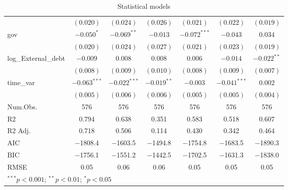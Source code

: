\begin{table}
\begin{center}
\begin{tabular}{l c c c c c c}
                    & $(0.020)$      & $(0.024)$      & $(0.026)$     & $(0.021)$      & $(0.022)$      & $(0.019)$     \\
gov                 & $-0.050^{*}$   & $-0.069^{**}$  & $-0.013$      & $-0.072^{***}$ & $-0.043$       & $0.034$       \\
                    & $(0.020)$      & $(0.024)$      & $(0.027)$     & $(0.021)$      & $(0.023)$      & $(0.019)$     \\
log\_External\_debt & $-0.009$       & $0.008$        & $0.008$       & $0.006$        & $-0.014$       & $-0.022^{**}$ \\
                    & $(0.008)$      & $(0.009)$      & $(0.010)$     & $(0.008)$      & $(0.009)$      & $(0.007)$     \\
time\_var           & $-0.063^{***}$ & $-0.022^{***}$ & $-0.019^{**}$ & $-0.003$       & $-0.041^{***}$ & $0.002$       \\
                    & $(0.005)$      & $(0.006)$      & $(0.006)$     & $(0.005)$      & $(0.005)$      & $(0.004)$     \\
\hline
\hline
Num.Obs. & \num{576} & \num{576} & \num{576} & \num{576} & \num{576} & \num{576}\\
R2 & \num{0.794} & \num{0.638} & \num{0.351} & \num{0.583} & \num{0.518} & \num{0.607}\\
R2 Adj. & \num{0.718} & \num{0.506} & \num{0.114} & \num{0.430} & \num{0.342} & \num{0.464}\\
AIC & \num{-1808.4} & \num{-1603.5} & \num{-1494.8} & \num{-1754.8} & \num{-1683.5} & \num{-1890.3}\\
BIC & \num{-1756.1} & \num{-1551.2} & \num{-1442.5} & \num{-1702.5} & \num{-1631.3} & \num{-1838.0}\\
RMSE & \num{0.05} & \num{0.06} & \num{0.06} & \num{0.05} & \num{0.05} & \num{0.05}\\
\hline
\multicolumn{7}{l}{\scriptsize{$^{***}p<0.001$; $^{**}p<0.01$; $^{*}p<0.05$}}
\end{tabular}
\caption{Statistical models}
\label{table:FE_RQ1_Log}
\end{center}
\end{table}